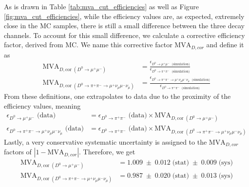 As is drawn in Table \ref{tab:mva_cut_efficiencies} as well as Figure \ref{fig:mva_cut_efficiencies}, while the efficiency values are, as expected, extremely close in the MC samples, there is still a small difference between the three decay channels. To account for this small difference, we calculate a corrective efficiency factor, derived from MC. We name this corrective factor $\text{MVA}_{D, cor}$ and define it as
\begin{equation}
    \begin{split}
    \text{MVA}_{D,\text{cor}\;(D^0 \to \mu^+ \mu^-)} &= 
    \frac{\epsilon_{D^0 \to \mu^+ \mu^-\; \text{ (simulation)}}}
         {\epsilon_{D^0 \to \pi^+ \pi^-\; \text{ (simulation)}}} \\
    \text{MVA}_{D,\text{cor}\;(D^0 \to \pi^+ \pi^- \to \mu^+ \nu_\mu \mu^- \nu_\mu)} &= 
    \frac{\epsilon_{D^0 \to \pi^+ \pi^- \to \mu^+ \nu_\mu \mu^- \nu_\mu\; \text{ (simulation)}}}
         {\epsilon_{D^0 \to \pi^+ \pi^-\; \text{ (simulation)}}}
    \end{split}
\end{equation}
From these definitions, one extrapolates to data due to the proximity of the efficiency values, meaning
\begin{equation}
    \begin{split}
    \epsilon_{D^0 \to \mu^+ \mu^-} \text{ (data)} &= 
    \epsilon_{D^0 \to \pi^+ \pi^-} \text{ (data)} 
    \times \text{MVA}_{D,\text{cor}\;(D^0 \to \mu^+ \mu^-)} \\
    \epsilon_{D^0 \to \pi^+ \pi^- \to \mu^+ \nu_\mu \mu^- \nu_\mu} \text{ (data)} &= 
    \epsilon_{D^0 \to \pi^+ \pi^-} \text{ (data)} 
    \times \text{MVA}_{D,\text{cor}\;(D^0 \to \pi^+ \pi^- \to \mu^+ \nu_\mu \mu^- \nu_\mu)}
    \end{split}
\end{equation}
Lastly, a very conservative systematic uncertainty is assigned to the $\text{MVA}_{D, cor}$ factors of $|1-\text{MVA}_{D, cor}|$. Therefore, we get
\begin{equation}
\begin{split}
    \text{MVA}_{D,\text{cor}\;(D^0 \to \mu^+ \mu^-)} &= 1.009\;\pm\;0.012 \; \text{(stat)}\;\pm\;0.009 \; \text{(sys)} \\
    \text{MVA}_{D,\text{cor}\;(D^0 \to \pi^+ \pi^- \to \mu^+ \nu_\mu \mu^- \nu_\mu)} &= 0.987\;\pm\;0.020 \; \text{(stat)}\;\pm\;0.013 \; \text{(sys)}
\end{split}
\end{equation}
    
